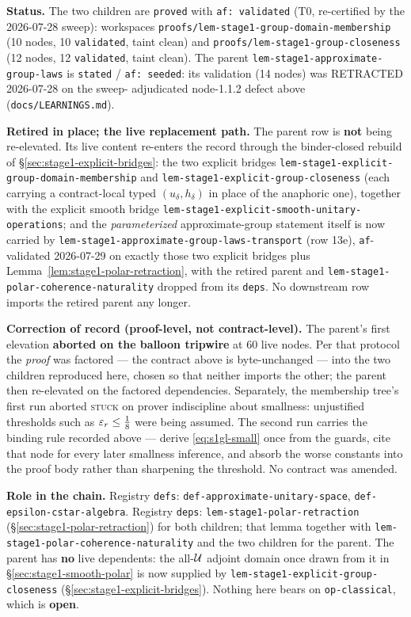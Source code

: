 \medskip
\noindent\textbf{Status.} The two children are \texttt{proved} with \texttt{af: validated}
(T0, re-certified by the 2026-07-28 sweep): workspaces
\texttt{proofs/lem-stage1-group-domain-membership} (10 nodes, 10 \texttt{validated}, taint
clean) and \texttt{proofs/lem-stage1-group-closeness} (12 nodes, 12 \texttt{validated},
taint clean). The parent \texttt{lem-stage1-approximate-group-laws} is \texttt{stated} /
\texttt{af: seeded}: its validation (14 nodes) was RETRACTED 2026-07-28 on the sweep-
adjudicated node-1.1.2 defect above (\texttt{docs/LEARNINGS.md}).

\noindent\textbf{Retired in place; the live replacement path.} The parent row is
\textbf{not} being re-elevated. Its live content re-enters the record through the
binder-closed rebuild of \S\ref{sec:stage1-explicit-bridges}: the two explicit bridges
\texttt{lem-stage1-explicit-group-domain-membership} and
\texttt{lem-stage1-explicit-group-closeness} (each carrying a contract-local typed
$(u_\delta,h_\delta)$ in place of the anaphoric one), together with the explicit smooth
bridge \texttt{lem-stage1-explicit-smooth-unitary-operations}; and the
\emph{parameterized} approximate-group statement itself is now carried by
\texttt{lem-stage1-approximate-group-laws-transport} (row 13e), \texttt{af}-validated
2026-07-29 on exactly those two explicit bridges plus
Lemma~\ref{lem:stage1-polar-retraction}, with the retired parent and
\texttt{lem-stage1-polar-coherence-naturality} dropped from its \texttt{deps}. No
downstream row imports the retired parent any longer.

\noindent\textbf{Correction of record (proof-level, not contract-level).} The parent's first
elevation \textbf{aborted on the balloon tripwire} at 60 live nodes. Per that protocol the
\emph{proof} was factored --- the contract above is byte-unchanged --- into the two children
reproduced here, chosen so that neither imports the other; the parent then re-elevated on the
factored dependencies. Separately, the membership tree's first run aborted \textsc{stuck} on
prover indiscipline about smallness: unjustified thresholds such as $\varepsilon_r\le\tfrac18$ were
being assumed. The second run carries the binding rule recorded above --- derive
\eqref{eq:s1gl-small} once from the guards, cite that node for every later smallness
inference, and absorb the worse constants into the proof body rather than sharpening the
threshold. No contract was amended.

\noindent\textbf{Role in the chain.} Registry \texttt{defs}:
\texttt{def-approximate-unitary-space}, \texttt{def-epsilon-cstar-algebra}. Registry
\texttt{deps}: \texttt{lem-stage1-polar-retraction} (\S\ref{sec:stage1-polar-retraction}) for
both children; that lemma together with \texttt{lem-stage1-polar-coherence-naturality} and
the two children for the parent. The parent has \textbf{no} live dependents: the all-$\mathcal U$
adjoint domain once drawn from it in \S\ref{sec:stage1-smooth-polar} is now supplied by
\texttt{lem-stage1-explicit-group-closeness} (\S\ref{sec:stage1-explicit-bridges}). Nothing
here bears on \texttt{op-classical}, which is \textbf{open}.
